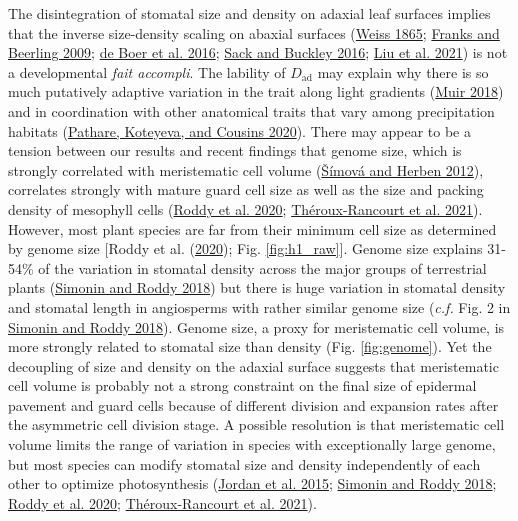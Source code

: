 \documentclass[
  12pt,
]{article}
\begin{document}
The disintegration of stomatal size and density on adaxial leaf surfaces implies that the inverse size-density scaling on abaxial surfaces (\protect\hyperlink{ref-weiss_untersuchungen_1865}{Weiss 1865}; \protect\hyperlink{ref-franks_maximum_2009}{Franks and Beerling 2009}; \protect\hyperlink{ref-de_boer_optimal_2016}{de Boer et al. 2016}; \protect\hyperlink{ref-sack_developmental_2016}{Sack and Buckley 2016}; \protect\hyperlink{ref-liu_scaling_2021}{Liu et al. 2021}) is not a developmental \emph{fait accompli}. The lability of \(D_\text{ad}\) may explain why there is so much putatively adaptive variation in the trait along light gradients (\protect\hyperlink{ref-muir_light_2018}{Muir 2018}) and in coordination with other anatomical traits that vary among precipitation habitats (\protect\hyperlink{ref-pathare_increased_2020}{Pathare, Koteyeva, and Cousins 2020}). There may appear to be a tension between our results and recent findings that genome size, which is strongly correlated with meristematic cell volume (\protect\hyperlink{ref-simova_geometrical_2012}{Šímová and Herben 2012}), correlates strongly with mature guard cell size as well as the size and packing density of mesophyll cells (\protect\hyperlink{ref-roddy_scaling_2020}{Roddy et al. 2020}; \protect\hyperlink{ref-theroux-rancourt_maximum_2021}{Théroux-Rancourt et al. 2021}). However, most plant species are far from their minimum cell size as determined by genome size {[}Roddy et al. (\protect\hyperlink{ref-roddy_scaling_2020}{2020}); Fig. \ref{fig:h1_raw}{]}. Genome size explains 31-54\% of the variation in stomatal density across the major groups of terrestrial plants (\protect\hyperlink{ref-simonin_genome_2018}{Simonin and Roddy 2018}) but there is huge variation in stomatal density and stomatal length in angiosperms with rather similar genome size (\emph{c.f.} Fig. 2 in \protect\hyperlink{ref-simonin_genome_2018}{Simonin and Roddy 2018}). Genome size, a proxy for meristematic cell volume, is more strongly related to stomatal size than density (Fig. \ref{fig:genome}). Yet the decoupling of size and density on the adaxial surface suggests that meristematic cell volume is probably not a strong constraint on the final size of epidermal pavement and guard cells because of different division and expansion rates after the asymmetric cell division stage. A possible resolution is that meristematic cell volume limits the range of variation in species with exceptionally large genome, but most species can modify stomatal size and density independently of each other to optimize photosynthesis (\protect\hyperlink{ref-jordan_environmental_2015}{Jordan et al. 2015}; \protect\hyperlink{ref-simonin_genome_2018}{Simonin and Roddy 2018}; \protect\hyperlink{ref-roddy_scaling_2020}{Roddy et al. 2020}; \protect\hyperlink{ref-theroux-rancourt_maximum_2021}{Théroux-Rancourt et al. 2021}).
\end{document}
